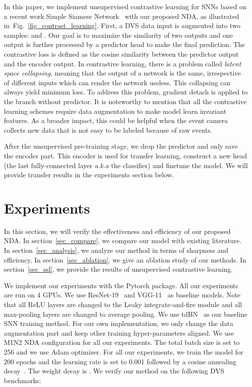\documentclass[runningheads]{llncs}
\newcommand{\bftab}{\fontseries{b}\selectfont}
\begin{document}
In this paper, we implement unsupervised contrastive learning for SNNs based on a recent work Simple Siamese Network~\cite{chen2021exploring} with our proposed NDA, as illustrated in~Fig.~\ref{fig_contrast_learning}.
First, a DVS data input  is augmented into two samples:  and . Our goal is to maximize the similarity of two outputs and one output is further processed by a predictor head to make the final prediction. 
The contrastive loss is defined as the cosine similarity between the predictor output and the encoder output. In contrastive learning, there is a problem called \textit{latent space collapsing}, meaning that the output of a network is the same, irrespective of different inputs which can render the network useless. This collapsing can always yield minimum loss. To address this problem, gradient detach is applied to the branch without predictor. 
It is noteworthy to mention that all the contrastive learning schemes require data augmentation to make model learn invariant features. As a broader impact, this could be helpful when the event camera collects new data that is not easy to be labeled because of raw events. 

After the unsupervised pre-training stage, we drop the predictor and only save the encoder part. This encoder is used for transfer learning, \ie construct a new head (the last fully-connected layer \textit{a.k.a} the classifier) and finetune the model. We will provide transfer results in the experiments section below. 

\section{Experiments}

In this section, we will verify the effectiveness and efficiency of our proposed NDA. In section~\ref{sec_compare}, we compare our model with existing literature. In section~\ref{sec_analysis}, we analyze our method in terms of sharpness and efficiency. In section~\ref{sec_ablation}, we give an ablation study of our methods. In section~\ref{sec_ssl}, we provide the results of unsupervised contrastive learning. 

\noindent{\bftab Implementation details. }We implement our experiments with the Pytorch package. All our experiments are run on 4 GPUs. We use ResNet-19~\cite{he2016deep,zheng2020going} and VGG-11~\cite{simonyan2014very,fang2021incorporating} as baseline models. Note that all ReLU layers are changed to the Leaky integrate-and-fire module and all max-pooling layers are changed to average pooling. We use tdBN~\cite{zheng2020going} as our baseline SNN training method. For our own implementation, we only change the data augmentation part and keep other training hyper-parameters aligned. We use M1N2 NDA configuration for all our experiments. The total batch size is set to 256 and we use Adam optimizer. For all our experiments, we train the model for 200 epochs and the learning rate is set to 0.001 followed by a cosine annealing decay~\cite{loshchilov2016sgdr}. The weight decay is . We verify our method on the following DVS benchmarks:
\end{document}
